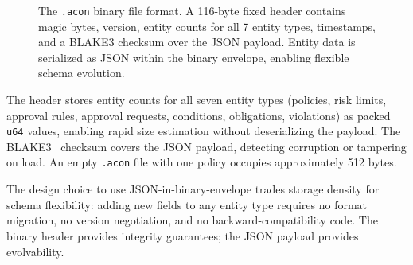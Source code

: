 \documentclass[10pt, twocolumn]{article}
\begin{document}
\begin{figure}[t]
\centering
{}
\caption{The \texttt{.acon} binary file format. A 116-byte fixed header contains magic bytes, version, entity counts for all 7 entity types, timestamps, and a BLAKE3 checksum over the JSON payload. Entity data is serialized as JSON within the binary envelope, enabling flexible schema evolution.}
\label{fig:fileformat}
\end{figure}

The header stores entity counts for all seven entity types (policies, risk limits, approval rules, approval requests, conditions, obligations, violations) as packed \texttt{u64} values, enabling rapid size estimation without deserializing the payload. The BLAKE3~\cite{blake3} checksum covers the JSON payload, detecting corruption or tampering on load. An empty \texttt{.acon} file with one policy occupies approximately 512 bytes.

The design choice to use JSON-in-binary-envelope trades storage density for schema flexibility: adding new fields to any entity type requires no format migration, no version negotiation, and no backward-compatibility code. The binary header provides integrity guarantees; the JSON payload provides evolvability.
\end{document}
